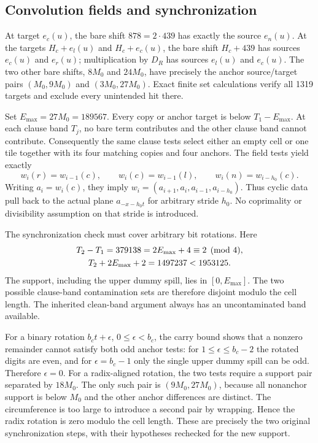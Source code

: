 \subsection{Convolution fields and synchronization}

At target $e_c(u)$, the bare shift $878=2\cdot439$ has exactly the
source $e_n(u)$.  At the targets $H_c+e_l(u)$ and $H_c+e_c(u)$, the bare
shift $H_c+439$ has sources $e_c(u)$ and $e_r(u)$; multiplication by
$D_R$ has sources $e_l(u)$ and $e_c(u)$.  The two other bare shifts,
$8M_0$ and $24M_0$, have precisely the anchor source/target pairs
$(M_0,9M_0)$ and $(3M_0,27M_0)$.  Exact finite set calculations verify
all 1319 targets and exclude every unintended hit there.

Set $E_{\max}=27M_0=189567$.  Every copy or anchor target is below
$T_1-E_{\max}$.  At each clause band $T_j$, no bare term contributes
and the other clause band cannot contribute.  Consequently the same
clause tests select either an empty cell or one tile together with its
four matching copies and four anchors.  The field tests yield exactly
\[
 w_i(r)=w_{i-1}(c),\qquad w_i(c)=w_{i-1}(l),\qquad
 w_i(n)=w_{i-h_0}(c).
\]
Writing $a_i=w_i(c)$, they imply
$w_i=(a_{i+1},a_i,a_{i-1},a_{i-h_0})$.  Thus cyclic data pull back to
the actual plane $a_{-x-h_0t}$ for arbitrary stride $h_0$.  No
coprimality or divisibility assumption on that stride is introduced.

The synchronization check must cover arbitrary bit rotations.  Here
\begin{gather}
 T_2-T_1=379138=2E_{\max}+4\equiv2\pmod4,\notag\\
 T_2+2E_{\max}+2=1497237<1953125.\label{eq:newseparation}
\end{gather}
The support, including the upper dummy spill, lies in
$[0,E_{\max}]$.  The two possible clause-band contamination sets are
therefore disjoint modulo the cell length.  The inherited clean-band
argument always has an uncontaminated band available.

For a binary rotation $b_ct+\epsilon$, $0\le\epsilon<b_c$, the carry bound
shows that a nonzero remainder cannot satisfy both odd anchor tests:
for $1\le\epsilon\le b_c-2$ the rotated digits are even, and for
$\epsilon=b_c-1$ only the single upper dummy spill can be odd.  Therefore
$\epsilon=0$.  For a radix-aligned rotation, the two tests require a
support pair separated by $18M_0$.  The only such pair is
$(9M_0,27M_0)$, because all nonanchor support is below $M_0$ and the
other anchor differences are distinct.  The circumference is too large
to introduce a second pair by wrapping.  Hence the radix rotation is
zero modulo the cell length.  These are precisely the two original
synchronization steps, with their hypotheses rechecked for the new
support.

